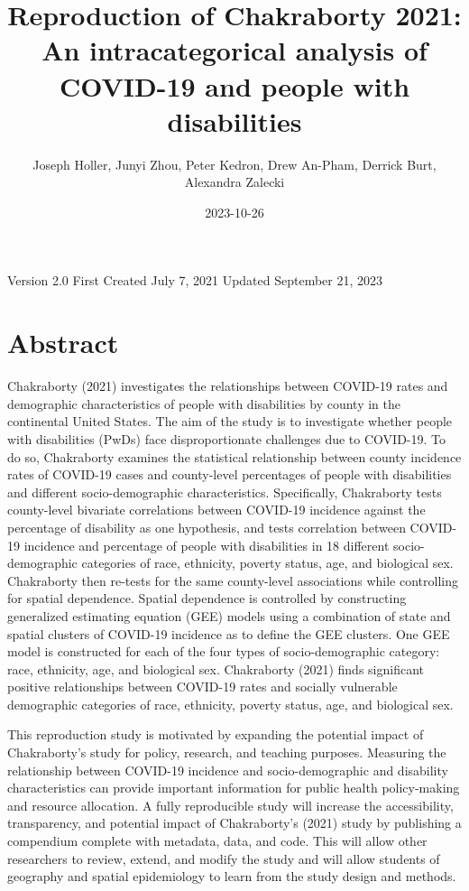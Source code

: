 \documentclass[
]{article}
\title{Reproduction of Chakraborty 2021: An intracategorical analysis of
COVID-19 and people with disabilities}
\author{Joseph Holler, Junyi Zhou, Peter Kedron, Drew An-Pham, Derrick
Burt, Alexandra Zalecki}
\date{2023-10-26}
\begin{document}
\maketitle

Version 2.0 \textbar{} First Created July 7, 2021 \textbar{} Updated
September 21, 2023

\hypertarget{abstract}{%
\section{Abstract}\label{abstract}}

Chakraborty (2021) investigates the relationships between COVID-19 rates
and demographic characteristics of people with disabilities by county in
the continental United States. The aim of the study is to investigate
whether people with disabilities (PwDs) face disproportionate challenges
due to COVID-19. To do so, Chakraborty examines the statistical
relationship between county incidence rates of COVID-19 cases and
county-level percentages of people with disabilities and different
socio-demographic characteristics. Specifically, Chakraborty tests
county-level bivariate correlations between COVID-19 incidence against
the percentage of disability as one hypothesis, and tests correlation
between COVID-19 incidence and percentage of people with disabilities in
18 different socio-demographic categories of race, ethnicity, poverty
status, age, and biological sex. Chakraborty then re-tests for the same
county-level associations while controlling for spatial dependence.
Spatial dependence is controlled by constructing generalized estimating
equation (GEE) models using a combination of state and spatial clusters
of COVID-19 incidence as to define the GEE clusters. One GEE model is
constructed for each of the four types of socio-demographic category:
race, ethnicity, age, and biological sex. Chakraborty (2021) finds
significant positive relationships between COVID-19 rates and socially
vulnerable demographic categories of race, ethnicity, poverty status,
age, and biological sex.

This reproduction study is motivated by expanding the potential impact
of Chakraborty's study for policy, research, and teaching purposes.
Measuring the relationship between COVID-19 incidence and
socio-demographic and disability characteristics can provide important
information for public health policy-making and resource allocation. A
fully reproducible study will increase the accessibility, transparency,
and potential impact of Chakraborty's (2021) study by publishing a
compendium complete with metadata, data, and code. This will allow other
researchers to review, extend, and modify the study and will allow
students of geography and spatial epidemiology to learn from the study
design and methods.
\end{document}
